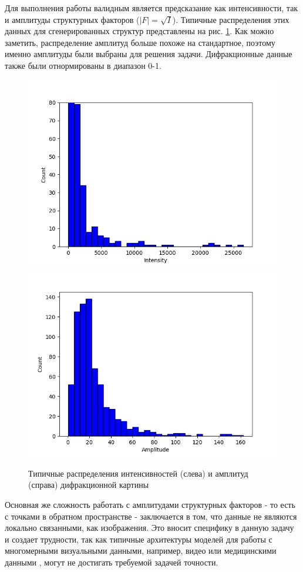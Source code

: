 Для выполнения работы валидным является предсказание как интенсивности, так и амплитуды структурных факторов ($|F| = \sqrt{I}$). Типичные распределения этих данных для сгенерированных структур представлены на рис. \ref{F_dist}. Как можно заметить, распределение амплитуд больше похоже на стандартное, поэтому именно амплитуды были выбраны для решения задачи. Дифракционные данные также были отнормированы в диапазон 0-1.

\begin{figure}[ht!]
            \includegraphics[width=.5\textwidth]{figures/F2_distribution.png}\hfill
            \includegraphics[width=.5\textwidth]{figures/F_distribution.png}
            \caption{Типичные распределения интенсивностей (слева) и амплитуд (справа) дифракционной картины}
            \label{F_dist}
\end{figure}

Основная же сложность работать с амплитудами структурных факторов - то есть с точками в обратном пространстве - заключается в том, что данные не являются локально связанными, как изображения. Это вносит специфику в данную задачу и создает трудности, так как типичные архитектуры моделей для работы с многомерными визуальными данными, например, видео или медицинскими данными \cite{mrt}, могут не достигать требуемой задачей точности.

